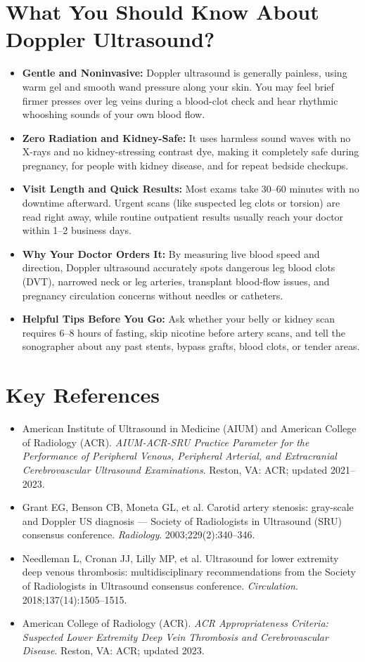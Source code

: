 \section{What You Should Know About Doppler Ultrasound?}
\begin{itemize}
\item \textbf{Gentle and Noninvasive:} Doppler ultrasound is generally painless, using warm gel and smooth wand pressure along your skin. You may feel brief firmer presses over leg veins during a blood-clot check and hear rhythmic whooshing sounds of your own blood flow.
\item \textbf{Zero Radiation and Kidney-Safe:} It uses harmless sound waves with no X-rays and no kidney-stressing contrast dye, making it completely safe during pregnancy, for people with kidney disease, and for repeat bedside checkups.
\item \textbf{Visit Length and Quick Results:} Most exams take 30--60 minutes with no downtime afterward. Urgent scans (like suspected leg clots or torsion) are read right away, while routine outpatient results usually reach your doctor within 1--2 business days.
\item \textbf{Why Your Doctor Orders It:} By measuring live blood speed and direction, Doppler ultrasound accurately spots dangerous leg blood clots (DVT), narrowed neck or leg arteries, transplant blood-flow issues, and pregnancy circulation concerns without needles or catheters.
\item \textbf{Helpful Tips Before You Go:} Ask whether your belly or kidney scan requires 6--8 hours of fasting, skip nicotine before artery scans, and tell the sonographer about any past stents, bypass grafts, blood clots, or tender areas.
\end{itemize}

\section{Key References}
\begin{itemize}
\item American Institute of Ultrasound in Medicine (AIUM) and American College of Radiology (ACR). \textit{AIUM-ACR-SRU Practice Parameter for the Performance of Peripheral Venous, Peripheral Arterial, and Extracranial Cerebrovascular Ultrasound Examinations}. Reston, VA: ACR; updated 2021--2023.
\item Grant EG, Benson CB, Moneta GL, et al. Carotid artery stenosis: gray-scale and Doppler US diagnosis --- Society of Radiologists in Ultrasound (SRU) consensus conference. \textit{Radiology}. 2003;229(2):340--346.
\item Needleman L, Cronan JJ, Lilly MP, et al. Ultrasound for lower extremity deep venous thrombosis: multidisciplinary recommendations from the Society of Radiologists in Ultrasound consensus conference. \textit{Circulation}. 2018;137(14):1505--1515.
\item American College of Radiology (ACR). \textit{ACR Appropriateness Criteria: Suspected Lower Extremity Deep Vein Thrombosis and Cerebrovascular Disease}. Reston, VA: ACR; updated 2023.
\end{itemize}
